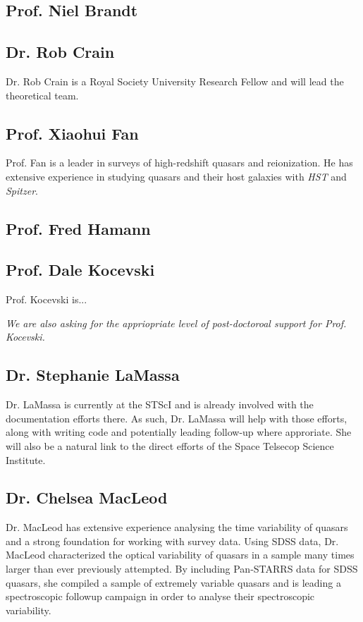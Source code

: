\subsection*{Prof. Niel Brandt}


\subsection*{Dr. Rob Crain}
Dr. Rob Crain is a Royal Society University Research Fellow and will 
lead the theoretical team. 


\subsection*{Prof. Xiaohui Fan}
Prof. Fan is a leader in surveys of high-redshift quasars and
reionization. He has extensive experience in studying quasars and
their host galaxies with {\it HST} and {\it Spitzer}.


\subsection*{Prof. Fred Hamann}


\subsection*{Prof. Dale Kocevski}
Prof. Kocevski is...

{\it We are also asking for the appriopriate level of post-doctoroal support for Prof. Kocevski.}


\iffalse
\subsection*{Prof. Linhua Jiang}
\fi


\subsection*{Dr. Stephanie LaMassa}
Dr. LaMassa is currently at the STScI and is already involved with the
documentation efforts there. As such, Dr. LaMassa will help with those
efforts, along with writing code and potentially leading follow-up
where approriate. She will also be a natural link to the direct
efforts of the Space Telsecop Science Institute.


\subsection*{Dr. Chelsea MacLeod}
Dr. MacLeod has extensive experience analysing the time variability of
quasars and a strong foundation for working with survey data.  Using
SDSS data, Dr. MacLeod characterized the optical variability of
quasars in a sample many times larger than ever previously attempted.
By including Pan-STARRS data for SDSS quasars, she compiled a sample
of extremely variable quasars and is leading a spectroscopic followup
campaign in order to analyse their spectroscopic variability.


